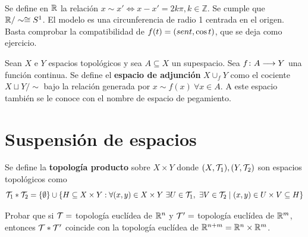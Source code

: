 \documentclass[GTS.tex]{subfiles}
\begin{document}
\begin{ej}\

\end{ej}

\begin{ej} Se define en $\mathbb{R}$ la relación $x\sim x'\Leftrightarrow x-x'=2k\pi,k\in\mathbb{Z}$. Se cumple que $\mathbb{R}/\sim\cong S^1$. El modelo es una circunferencia de radio 1 centrada en el origen. Basta comprobar la compatibilidad de $f(t)=(sen t,\cos{t})$, que se deja como ejercicio.
\end{ej}

\begin{defi} Sean $X$ e $Y$ espacios topológicos y sea $A\subseteq X$ un supespacio. Sea $f\colon{A}\longrightarrow{Y}$ una función continua. Se define el \textbf{espacio de adjunción} $X\cup_f Y$ como el cociente $X\sqcup Y/\sim$ bajo la relación generada por $x\sim f(x)\ \forall x\in A$. A este espacio también se le conoce con el nombre de espacio de pegamiento.
\end{defi}

\section{Suspensión de espacios}
\begin{defi}Se define la \textbf{topología producto} sobre $X\times Y$ donde $(X,\mathcal{T}_1), (Y,\mathcal{T}_2)$ son espacios topológicos como
\[
\mathcal{T}_1*\mathcal{T}_2=\{\emptyset\}\cup\{H\subseteq X\times Y:\forall(x,y)\in X\times Y\ \exists U\in\mathcal{T}_1,\ \exists V\in\mathcal{T}_2\mid(x,y)\in U\times V\subseteq H\}
\]
\end{defi}

\begin{ejer}Probar que si $\mathcal{T}=$ topología euclídea de $\mathbb{R}^n$ y $\mathcal{T}'=$ topología euclídea de $\mathbb{R}^m$, entonces $\mathcal{T}*\mathcal{T}'$ coincide con la topología euclídea de $\mathbb{R}^{n+m}=\mathbb{R}^n\times\mathbb{R}^m$.
\end{ejer}
\end{document}
